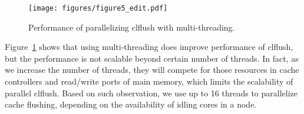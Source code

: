 \begin{comment}
\begin{figure}
\centering
\texttt{[image: figures/clflush\_perf.png]}
\caption{Performance of parallelizing {\fontfamily{qcr}\selectfont clflush} with multi-threading.}
\label{fig:clflush_perf}
\end{figure}
\end{comment}
\begin{comment}
\begin{table}
\centering
\footnotesize 
\begin{tabular}{|c | c|}
       \hline
       Number of threads & Throughput(\#insts/second) \\
        \hline \hline
        1 & 3.61E+05 \\  \hline 
        2 & 7.71E+05  \\  \hline 
        4 & 1.52E+06  \\  \hline 
        8 & 2.97E+06  \\  \hline 
        16 & 5.18E+06  \\  \hline 
        32 & 6.48E+06  \\   \hline 
        64 & 2.95E+06\\ \hline
        128 & 4.74E+05\\ \hline
       \hline
\end{tabular}
\caption{Performance of parallelizing {\fontfamily{qcr}\selectfont clflush} with multi-threading.}
\label{tab:clflush_perf}
\end{table}
\end{comment}

\begin{figure}
\centering
\texttt{[image: figures/figure5\_edit.pdf]}
\vspace{-20pt}
\caption{Performance of parallelizing {\selectfont clflush} with multi-threading.}
\label{fig:clflush_perf}
\vspace{-10pt}
\end{figure}

Figure~\ref{fig:clflush_perf} shows that using multi-threading
does improve performance of {\selectfont clflush}, but the performance is not scalable beyond certain number of threads.
In fact, as we increase the number of threads, they will compete for
those resources in cache controllers and read/write ports of main memory,
which limits the scalability of parallel {\selectfont clflush}. Based on such observation, we use up to 16 threads to 
parallelize cache flushing, depending on the availability of idling cores
in a node.

